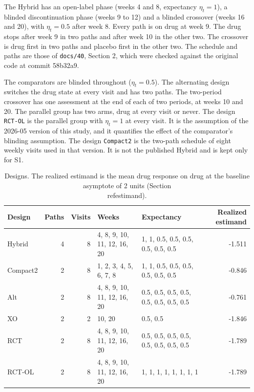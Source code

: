 \documentclass[
  11pt,
]{article}
\begin{document}
The Hybrid has an open-label phase (weeks 4 and 8, expectancy \(\eta_t = 1\)), a blinded discontinuation phase (weeks 9 to 12) and a blinded crossover (weeks 16 and 20), with \(\eta_t = 0.5\) after week 8. Every path is on drug at week 9. The drug stops after week 9 in two paths and after week 10 in the other two. The crossover is drug first in two paths and placebo first in the other two. The schedule and paths are those of \texttt{docs/40}, Section 2, which were checked against the original code at commit 58b32a9.

The comparators are blinded throughout (\(\eta_t = 0.5\)). The alternating design switches the drug state at every visit and has two paths. The two-period crossover has one assessment at the end of each of two periods, at weeks 10 and 20. The parallel group has two arms, drug at every visit or never. The design \texttt{RCT-OL} is the parallel group with \(\eta_t = 1\) at every visit. It is the assumption of the 2026-05 version of this study, and it quantifies the effect of the comparator's blinding assumption. The design \texttt{Compact2} is the two-path schedule of eight weekly visits used in that version. It is not the published Hybrid and is kept only for S1.

\begin{table}

\caption{\label{tab:design-summary}Designs. The realized estimand is the mean drug response on drug at the baseline asymptote of 2 units (Section \\ref{estimand}).}
\centering
\begin{tabular}[t]{lrrllr}
\toprule
Design & Paths & Visits & Weeks & Expectancy & Realized estimand\\
\midrule
Hybrid & 4 & 8 & 4, 8, 9, 10, 11, 12, 16, 20 & 1, 1, 0.5, 0.5, 0.5, 0.5, 0.5, 0.5 & -1.511\\
Compact2 & 2 & 8 & 1, 2, 3, 4, 5, 6, 7, 8 & 1, 1, 0.5, 0.5, 0.5, 0.5, 0.5, 0.5 & -0.846\\
Alt & 2 & 8 & 4, 8, 9, 10, 11, 12, 16, 20 & 0.5, 0.5, 0.5, 0.5, 0.5, 0.5, 0.5, 0.5 & -0.761\\
XO & 2 & 2 & 10, 20 & 0.5, 0.5 & -1.846\\
RCT & 2 & 8 & 4, 8, 9, 10, 11, 12, 16, 20 & 0.5, 0.5, 0.5, 0.5, 0.5, 0.5, 0.5, 0.5 & -1.789\\
\addlinespace
RCT-OL & 2 & 8 & 4, 8, 9, 10, 11, 12, 16, 20 & 1, 1, 1, 1, 1, 1, 1, 1 & -1.789\\
\bottomrule
\end{tabular}
\end{table}
\end{document}
